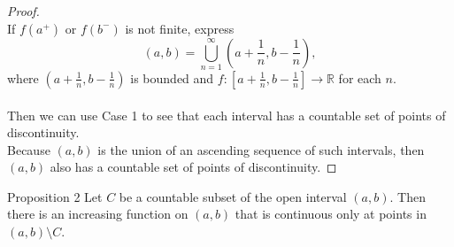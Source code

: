 \begin{proof}
    \\If $f(a^+)$ or $f(b^-)$ is not finite, express
    \[
        (a,b)=\bigcup_{n=1}^\infty\left(a+\frac{1}{n},b-\frac{1}{n}\right),
    \]
    where $\left(a+\frac{1}{n},b-\frac{1}{n}\right)$ is bounded and $f:\left[a+\frac{1}{n},b-\frac{1}{n}\right]\to\mathbb{R}$ for each $n$.\\
    \\Then we can use Case 1 to see that each interval has a countable set of points of discontinuity.
    \\Because $(a,b)$ is the union of an ascending sequence of such intervals, then $(a,b)$ also has a countable set of points of discontinuity.
\end{proof}
\begin{namedthm*}{Proposition 2}
    Let $C$ be a countable subset of the open interval $(a,b)$.
    Then there is an increasing function on $(a,b)$ that is continuous only at points in $(a,b)\setminus C$.
\end{namedthm*}
